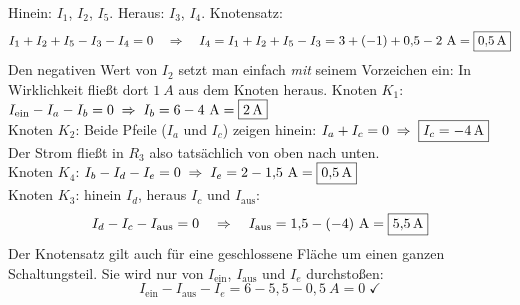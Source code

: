 \documentclass[11pt,a4paper]{article}
\begin{document}
\begin{loesung}
Hinein: $I_1$, $I_2$, $I_5$. Heraus: $I_3$, $I_4$. Knotensatz:
\[
  I_1 + I_2 + I_5 - I_3 - I_4 = 0
  \quad\Rightarrow\quad
  I_4 = I_1 + I_2 + I_5 - I_3 = 3 + (-1) + 0{,}5 - 2\ \si{A} = \ergebnis{\SI{0.5}{A}}
\]
Den negativen Wert von $I_2$ setzt man einfach \emph{mit} seinem Vorzeichen ein: In Wirklichkeit fließt dort $\SI{1}{A}$ aus dem Knoten heraus.
Knoten $K_1$: $I_\text{ein} - I_a - I_b = 0 \;\Rightarrow\; I_b = 6 - 4\ \si{A} = \ergebnis{\SI{2}{A}}$\\[2pt]
Knoten $K_2$: Beide Pfeile ($I_a$ und $I_c$) zeigen hinein: $I_a + I_c = 0 \;\Rightarrow\; \ergebnis{I_c = \SI{-4}{A}}$\\
\phantom{Knoten $K_2$:} Der Strom fließt in $R_3$ also tatsächlich von oben nach unten.\\[2pt]
Knoten $K_4$: $I_b - I_d - I_e = 0 \;\Rightarrow\; I_e = 2 - 1{,}5\ \si{A} = \ergebnis{\SI{0.5}{A}}$\\[2pt]
Knoten $K_3$: hinein $I_d$, heraus $I_c$ und $I_\text{aus}$:
\[
  I_d - I_c - I_\text{aus} = 0 \quad\Rightarrow\quad I_\text{aus} = 1{,}5 - (-4)\ \si{A} = \ergebnis{\SI{5.5}{A}}
\]
Der Knotensatz gilt auch für eine geschlossene Fläche um einen ganzen Schaltungsteil. Sie wird nur von $I_\text{ein}$, $I_\text{aus}$ und $I_e$ durchstoßen:
\[
  I_\text{ein} - I_\text{aus} - I_e = 6 - 5{,}5 - 0{,}5\ \si{A} = 0 \;\checkmark
\]
\end{loesung}
\end{document}
